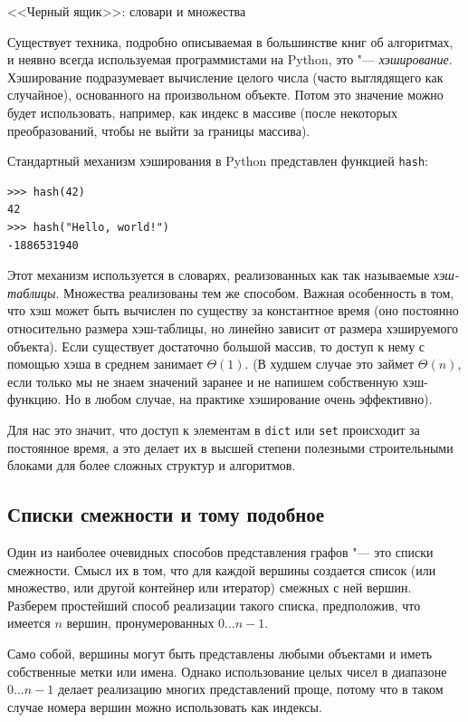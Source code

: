 \begin{notice}{<<Черный ящик>>: словари и множества}

Существует техника, подробно описываемая в большинстве книг об алгоритмах, и неявно всегда используемая программистами на Python, это "--- \textit{хэширование}. Хэширование подразумевает вычисление целого числа (часто выглядящего как случайное), основанного на произвольном объекте. Потом это значение можно будет использовать, например, как индекс в массиве (после некоторых преобразований, чтобы не выйти за границы массива).

Стандартный механизм хэширования в Python представлен функцией \texttt{hash}:
\begin{lstlisting}
>>> hash(42)
42
>>> hash("Hello, world!")
-1886531940
\end{lstlisting}

Этот механизм используется в словарях, реализованных как так называемые \textit{хэш-таблицы}. Множества реализованы тем же способом. Важная особенность в том, что хэш может быть вычислен по существу за константное время (оно постоянно относительно размера хэш-таблицы, но линейно зависит от размера хэшируемого объекта). Если существует достаточно большой массив, то доступ к нему с помощью хэша в среднем занимает $\Theta(1)$. (В худшем случае это займет $\Theta(n)$, если только мы не знаем значений заранее и не напишем собственную хэш-функцию. Но в любом случае, на практике хэширование очень эффективно). 

Для нас это значит, что доступ к элементам в \texttt{dict} или \texttt{set} происходит за постоянное время, а это делает их в высшей степени полезными строительными блоками для более сложных структур и алгоритмов.
\end{notice}


\subsection{Списки смежности и тому подобное}
\label{sec:adjacency-lists}

Один из наиболее очевидных способов представления графов "--- это списки смежности. Смысл их в том, что для каждой вершины создается список (или множество, или другой контейнер или итератор) смежных с ней вершин. Разберем простейший способ реализации такого списка, предположив, что имеется $n$ вершин, пронумерованных $0\ldots n-1$.

\begin{note}
Само собой, вершины могут быть представлены любыми объектами и иметь собственные метки или имена. Однако использование целых чисел в диапазоне $0\ldots n-1$ делает реализацию многих представлений проще, потому что в таком случае номера вершин можно использовать как индексы.
\end{note}


